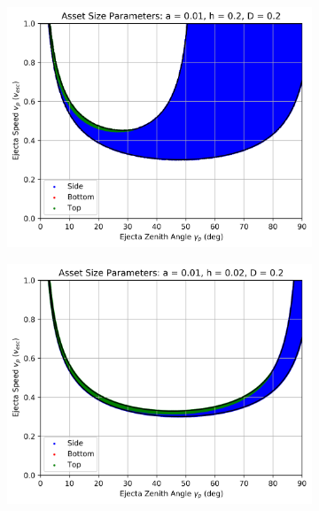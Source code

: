 \documentclass{article}
\begin{document}
\begin{figure}
	
	\begin{subfigure}[t]{.32\textwidth}
		\centering
		\includegraphics[width=.98\linewidth]{asset_speed_zenith_plot_1.000e-02_2.000e-01_2.000e-01.png}  
		\label{fig:sub-asset_speed_zenith_7}
	\end{subfigure}
	\begin{subfigure}[t]{.32\textwidth}
		\centering
		\includegraphics[width=.98\linewidth]{asset_speed_zenith_plot_1.000e-02_2.000e-02_2.000e-01.png}  
		\label{fig:sub-asset_speed_zenith_8}
	\end{subfigure}

\end{figure}
\end{document}
